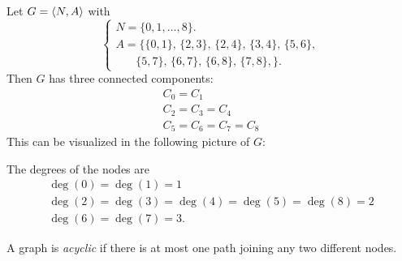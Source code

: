 \documentclass{amsart}
\begin{document}
\begin{exl}
    Let $G = \langle N, A \rangle$ with
    $$
    \begin{cases}
        N = \{0, 1, \dots, 8\}. \\
        A = \{ \{0,1\}, \, \{2,3\}, \, \{2,4\}, \, \{3,4\}, \, \{5,6\}, \\
            \ \ \ \ \ \ \ \ \{5,7\}, \, \{6,7\}, \, \{6,8\}, \, \{7,8\}, \}.
    \end{cases}
    $$
    Then $G$ has three connected components: 
    \begin{eqnarray*}
        C_0 = C_1 \\
        C_2 = C_3 = C_4 \\
        C_5 = C_6 = C_7 = C_8
    \end{eqnarray*}
    This can be visualized in the following picture of $G$:

    \bigskip
    
    
    \bigskip
    \bigskip
    
    The degrees of the nodes are 
    \begin{eqnarray*}
        \deg(0) = \deg(1) = 1 \\
        \deg(2) = \deg(3) = \deg(4) = \deg(5) = \deg(8) = 2 \\
        \deg(6) = \deg(7) = 3.
    \end{eqnarray*}
    
\end{exl}


\begin{defn}
    A graph is \emph{acyclic} if there is at most one path joining any two different nodes.
\end{defn}
\end{document}
